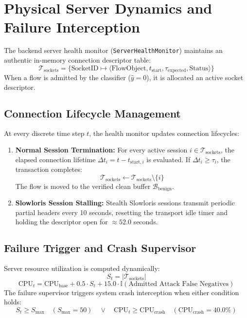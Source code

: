 \documentclass[12pt,a4paper,oneside]{report}
\begin{document}
\section{Physical Server Dynamics and Failure Interception}
The backend server health monitor (\texttt{ServerHealthMonitor}) maintains an authentic in-memory connection descriptor table:
\begin{equation}
\mathcal{T}_{\text{sockets}} = \{ \text{SocketID} \mapsto \langle \text{FlowObject}, t_{\text{start}}, \tau_{\text{expected}}, \text{Status} \rangle \}
\end{equation}
When a flow is admitted by the classifier ($\hat{y} = 0$), it is allocated an active socket descriptor.

\subsection{Connection Lifecycle Management}
At every discrete time step $t$, the health monitor updates connection lifecycles:
\begin{enumerate}
    \item \textbf{Normal Session Termination:} For every active session $i \in \mathcal{T}_{\text{sockets}}$, the elapsed connection lifetime $\Delta t_i = t - t_{\text{start}, i}$ is evaluated. If $\Delta t_i \ge \tau_i$, the transaction completes:
    \begin{equation}
    \mathcal{T}_{\text{sockets}} \gets \mathcal{T}_{\text{sockets}} \setminus \{i\}
    \end{equation}
    The flow is moved to the verified clean buffer $\mathcal{B}_{\text{benign}}$.
    \item \textbf{Slowloris Session Stalling:} Stealth Slowloris sessions transmit periodic partial headers every 10 seconds, resetting the transport idle timer and holding the descriptor open for $\approx 52.0$ seconds.
\end{enumerate}

\subsection{Failure Trigger and Crash Supervisor}
Server resource utilization is computed dynamically:
\begin{equation}
S_t = |\mathcal{T}_{\text{sockets}}|
\end{equation}
\begin{equation}
\text{CPU}_t = \text{CPU}_{\text{base}} + 0.5 \cdot S_t + 15.0 \cdot \mathbb{I}(\text{Admitted Attack False Negatives})
\end{equation}
The failure supervisor triggers system crash interception when either condition holds:
\begin{equation}
S_t \ge S_{\max} \quad (S_{\max} = 50) \quad \lor \quad \text{CPU}_t \ge \text{CPU}_{\text{crash}} \quad (\text{CPU}_{\text{crash}} = 40.0\%)
\end{equation}
\end{document}

